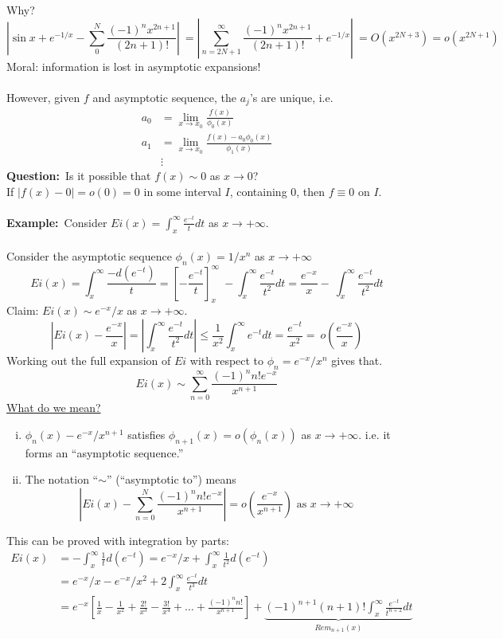 \documentclass{article}
\newcommand{\example}{\textbf{Example:}}
\newcommand{\question}{\textbf{Question:}}
\begin{document}
Why?
\[ \left| \sin x + e^{-1/x} - \sum_0^N \frac{ (-1)^n x^{2n+1}}{(2n+1)!} \right| \
= \left| \sum_{n = 2N+1}^{\infty} \frac{(-1)^n x^{2n+1}}{(2n+1)!} + e^{-1/x} \right| \
=O(x^{2N+3}) = o(x^{2N+1}) \]
Moral: information is lost in asymptotic expansions!
\\
\\
However, given $f$ and asymptotic sequence, the $a_j$'s are unique, i.e.
\begin{align*}
a_0 &= \lim_{x \to x_0} \frac{f(x)}{\phi_0(x)} \\
a_1 &= \lim_{x \to x_0} \frac{f(x)-a_0 \phi_0(x)}{\phi_1(x)} \\
& \vdots
\end{align*}
\question\ Is it possible that $f(x) \sim 0$ as $x \to 0$?
\\
If $|f(x) - 0| = o(0)=0$ in some interval $I$, containing $0$, then
$f \equiv 0$ on $I$.
\\
\\
\example\ Consider $\displaystyle Ei(x) = \int_{x}^{\infty} \frac{e^{-t}}{t} dt$
as $x \to + \infty$.
\\
\\
Consider the asymptotic sequence $\phi_n(x) = 1/x^n$ as $x \to + \infty$
\[ Ei(x) = \int_{x}^{\infty} \frac{-d(e^{-t})}{t} = \left[ -\frac{e^{-t}}{t} \right]_{x}^{\infty} \
- \int_x^{\infty} \frac{e^{-t}}{t^2} dt = \frac{e^{-x}}{x} - \
\int_x^{\infty} \frac{e^{-t}}{t^2} dt\]
Claim: $Ei(x) \sim e^{-x}/x$ as $x \to + \infty$.
\[ \left| Ei(x) - \frac{e^{-x}}{x} \right| = \left| \int_x^{\infty} \frac{e^{-t}}{t^2} dt \right|
\leq \frac{1}{x^2} \int_x^{\infty} e^{-t} dt = \frac{e^{-t}}{x^2} = \
o\left(\frac{e^{-x}}{x} \right) \]
Working out the full expansion of $Ei$ with respect to
$\phi_n = e^{-x}/x^n$ gives that.
\[ Ei(x) \sim \sum_{n=0}^{\infty} \frac{(-1)^n n! e^{-x}}{x^{n+1}} \]
\underline{What do we mean?}
\begin{enumerate}[(i)]
\item $\phi_n (x) - e^{-x}/x^{n+1}$ satisfies
		$\phi_{n+1}(x) = o(\phi_n(x))$ as $x \to + \infty$.
		i.e. it forms an ``asymptotic sequence.''
\item The notation ``$\sim$'' (``asymptotic to'') means
\[ \left|Ei(x) - \sum_{n=0}^N \frac{(-1)^n n! e^{-x} }{x^{n+1}} \right| = o\left(
\frac{e^{-x}}{x^{n+1}} \right) \mbox{ as } x \to + \infty\]
\end{enumerate}
This can be proved with integration by parts:
\begin{align*}
Ei(x) &= -\int_x^{\infty} \frac{1}{t} d(e^{-t}) = e^{-x}/x + \int_x^{\infty}
\frac{1}{t^2} d(e^{-t}) \\
&= e^{-x}/x - e^{-x}/x^2 + 2 \int_x^{\infty} \frac{e^{-t}}{t^3}dt  \\
&= e^{-x} \left[ \frac{1}{x} - \frac{1}{x^2} + \frac{2!}{x^3} - \frac{3!}{x^4}
+ \dots + \frac{(-1)^n n!}{x^{n+1}} \right] + \underbrace{(-1)^{n+1} (n+1)!
\int_x^{\infty} \frac{e^{-t}}{t^{n+2}} dt}_{Rem_{n+1}(x)}
\end{align*}
\end{document}
